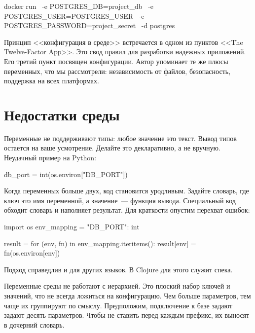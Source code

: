 \begin{english}
  \begin{bash}
docker run \
  -e POSTGRES_DB=project_db \
  -e POSTGRES_USER=POSTGRES_USER \
  -e POSTGRES_PASSWORD=project_secret \
  -d postgres
  \end{bash}
\end{english}

Принцип <<конфигурация в среде>> встречается в одном из пунктов <<The
Twelve-Factor App>>. Это свод правил для
разработки надежных приложений. Его третий пункт посвящен конфигурации. Автор
упоминает те же плюсы переменных, что мы рассмотрели: независимость от файлов,
безопасность, поддержка на всех платформах.

\section{Недостатки среды}

Переменные не поддерживают типы: любое значение это текст. Вывод типов остается
на ваше усмотрение. Делайте это декларативно, а не вручную. Неудачный пример на
Python:

\begin{english}
  \begin{python}
db_port = int(os.environ["DB_PORT"])
  \end{python}
\end{english}

Когда переменных больше двух, код становится уродливым. Задайте словарь, где
ключ это имя переменной, а значение~--- функция вывода. Специальный код обходит
словарь и наполняет результат. Для краткости опустим перехват ошибок:

\begin{english}
  \begin{python}
import os
env_mapping = {"DB_PORT": int}

result = {}
for (env, fn) in env_mapping.iteritems():
    result[env] = fn(os.environ[env])
  \end{python}
\end{english}

\noindent
Подход справедлив и для других языков. В Clojure для этого служит спека.

Переменные среды не работают с иерархией. Это плоский набор ключей и значений,
что не всегда ложиться на конфигурацию. Чем больше параметров, тем чаще их
группируют по смыслу. Предположим, подключение к базе задают задают десять
параметров. Чтобы не ставить перед каждым префикс, их выносят в дочерний
словарь.

